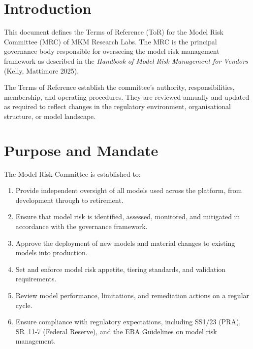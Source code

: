 \documentclass[11pt]{article}
\begin{document}
\mkmtitlepage
\mkmlegalpage
\tableofcontents
\clearpage

\section{Introduction}

This document defines the Terms of Reference (ToR) for the Model Risk Committee
(MRC) of MKM Research Labs. The MRC is the principal governance body
responsible for overseeing the model risk management framework as described in
the \textit{Handbook of Model Risk Management for Vendors} (Kelly, Mattimore 2025).

The Terms of Reference establish the committee's authority, responsibilities,
membership, and operating procedures. They are reviewed annually and updated as
required to reflect changes in the regulatory environment, organisational
structure, or model landscape.

\section{Purpose and Mandate}

The Model Risk Committee is established to:

\begin{enumerate}[label=\arabic*.]
    \item Provide independent oversight of all models used across the platform,
          from development through to retirement.
    \item Ensure that model risk is identified, assessed, monitored, and
          mitigated in accordance with the governance framework.
    \item Approve the deployment of new models and material changes to existing
          models into production.
    \item Set and enforce model risk appetite, tiering standards, and validation
          requirements.
    \item Review model performance, limitations, and remediation actions on a
          regular cycle.
    \item Ensure compliance with regulatory expectations, including SS1/23 (PRA),
          SR~11-7 (Federal Reserve), and the EBA Guidelines on model risk
          management.
\end{enumerate}
\end{document}

